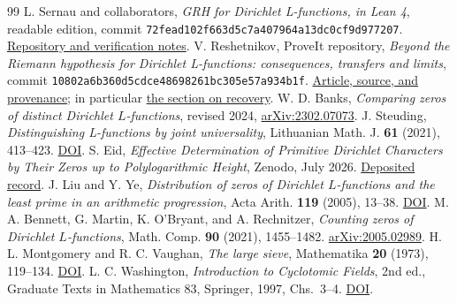 \documentclass[11pt]{article}
\begin{document}
\begin{thebibliography}{99}\small
{} L. Sernau and collaborators,
\emph{GRH for Dirichlet L-functions, in Lean 4}, readable edition,
commit \texttt{72fead102f663d5c7a407964a13dc0cf9d977207}.
\href{https://github.com/lsernau/grh-lean/tree/72fead102f663d5c7a407964a13dc0cf9d977207/grh}{Repository and verification notes}.
 V. Reshetnikov, ProveIt repository,
\emph{Beyond the Riemann hypothesis for Dirichlet L-functions: consequences,
transfers and limits}, commit \texttt{10802a6b360d5cdce48698261bc305e57a934b1f}.
\href{https://github.com/VladimirReshetnikov/ProveIt/tree/10802a6b360d5cdce48698261bc305e57a934b1f/Analysis/GeneralizedRiemannHypothesis/Article}{Article, source, and provenance};
in particular \href{https://github.com/VladimirReshetnikov/ProveIt/blob/10802a6b360d5cdce48698261bc305e57a934b1f/Analysis/GeneralizedRiemannHypothesis/Article/sections/rec.tex}{the section on recovery}.
 W. D. Banks, \emph{Comparing zeros of distinct Dirichlet
$L$-functions}, revised 2024, \href{https://arxiv.org/abs/2302.07073}{arXiv:2302.07073}.
 J. Steuding, \emph{Distinguishing L-functions by joint
universality}, Lithuanian Math. J. \textbf{61} (2021), 413--423.
\href{https://doi.org/10.1007/s10986-021-09531-y}{DOI}.
 S. Eid, \emph{Effective Determination of Primitive Dirichlet
Characters by Their Zeros up to Polylogarithmic Height}, Zenodo, July 2026.
\href{https://doi.org/10.5281/zenodo.21326652}{Deposited record}.
 J. Liu and Y. Ye, \emph{Distribution of zeros of Dirichlet
$L$-functions and the least prime in an arithmetic progression},
Acta Arith. \textbf{119} (2005), 13--38.
\href{https://doi.org/10.4064/aa119-1-2}{DOI}.
 M. A. Bennett, G. Martin, K. O'Bryant, and A. Rechnitzer,
\emph{Counting zeros of Dirichlet $L$-functions}, Math. Comp. \textbf{90}
(2021), 1455--1482. \href{https://arxiv.org/abs/2005.02989}{arXiv:2005.02989}.
 H. L. Montgomery and R. C. Vaughan, \emph{The large sieve},
Mathematika \textbf{20} (1973), 119--134.
\href{https://doi.org/10.1112/S0025579300004708}{DOI}.
 L. C. Washington, \emph{Introduction to Cyclotomic Fields},
2nd ed., Graduate Texts in Mathematics 83, Springer, 1997, Chs.~3--4.
\href{https://doi.org/10.1007/978-1-4612-1934-7}{DOI}.
\end{thebibliography}
\end{document}
